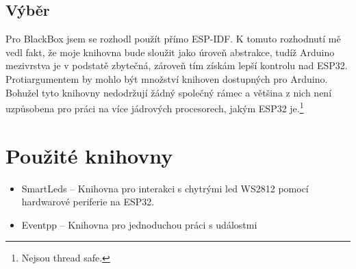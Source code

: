 \subsection{Výběr}

Pro BlackBox jsem se rozhodl použít přímo ESP-IDF.
K tomuto rozhodnutí mě vedl fakt, že moje knihovna bude sloužit jako úroveň abstrakce, tudíž Arduino mezivrstva je v podstatě zbytečná, zároveň tím získám lepší kontrolu nad ESP32.
Protiargumentem by mohlo být množství knihoven dostupných pro Arduino.
Bohužel tyto knihovny nedodržují žádný společný rámec a většina z nich není uzpůsobena pro práci na více jádrových procesorech, jakým ESP32 je.\footnote{Nejsou thread safe.}

\section{Použité knihovny}

\begin{itemize}
    \item SmartLeds --
        Knihovna pro interakci s chytrými led WS2812 pomocí hardwarové periferie na ESP32. %
    \item Eventpp --
        Knihovna pro jednoduchou práci s událostmi
\end{itemize}